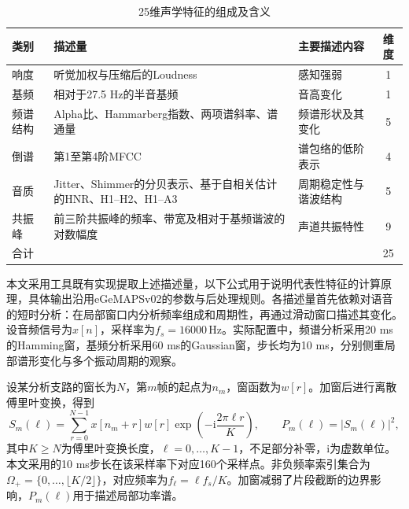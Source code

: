 \begin{table}[H]
    \centering\small
    \caption{25维声学特征的组成及含义}
    \label{tab:p1_acoustic_groups}
    \setlength{\tabcolsep}{6pt}
    \renewcommand{\arraystretch}{1.12}
    \ifdefined\pOneCompactTableBox\else\newsavebox{\pOneCompactTableBox}\fi
    \begin{lrbox}{\pOneCompactTableBox}
    \begin{tabular}{l>{\raggedright\arraybackslash}p{17em}>{\raggedright\arraybackslash}p{10em}c}
        \toprule
        类别 & 描述量 & 主要描述内容 & 维度\\
        \midrule
        响度 & 听觉加权与压缩后的Loudness & 感知强弱 & 1\\
        基频 & 相对于27.5 Hz的半音基频 & 音高变化 & 1\\
        频谱结构 & Alpha比、Hammarberg指数、两项谱斜率、谱通量 & 频谱形状及其变化 & 5\\
        倒谱 & 第1至第4阶MFCC & 谱包络的低阶表示 & 4\\
        音质 & Jitter、Shimmer的分贝表示、基于自相关估计的HNR、H1--H2、H1--A3 & 周期稳定性与谐波结构 & 5\\
        共振峰 & 前三阶共振峰的频率、带宽及相对于基频谐波的对数幅度 & 声道共振特性 & 9\\
        \midrule
        合计 & & & 25\\
        \bottomrule
    \end{tabular}
    \end{lrbox}
    \usebox{\pOneCompactTableBox}
\end{table}

本文采用工具既有实现提取上述描述量，以下公式用于说明代表性特征的计算原理，具体输出沿用eGeMAPSv02的参数与后处理规则。各描述量首先依赖对语音的短时分析：在局部窗口内分析频率组成和周期性，再通过滑动窗口描述其变化。设音频信号为$x[n]$，采样率为$f_s=16000\,\mathrm{Hz}$。实际配置中，频谱分析采用20 ms的Hamming窗，基频分析采用60 ms的Gaussian窗，步长均为10 ms，分别侧重局部谱形变化与多个振动周期的观察。

设某分析支路的窗长为$N$，第$m$帧的起点为$n_m$，窗函数为$w[r]$。加窗后进行离散傅里叶变换，得到
\begin{equation}
    S_m(\ell)=\sum_{r=0}^{N-1}x[n_m+r]w[r]
    \exp\!\left(-\mathrm{i}\frac{2\pi\ell r}{K}\right),
    \qquad P_m(\ell)=|S_m(\ell)|^2,
    \label{eq:p1_audio_spectrum}
\end{equation}
其中$K\geq N$为傅里叶变换长度，$\ell=0,\ldots,K-1$，不足部分补零，$\mathrm{i}$为虚数单位。本文采用的10 ms步长在该采样率下对应160个采样点。非负频率索引集合为$\Omega_+=\{0,\ldots,\lfloor K/2\rfloor\}$，对应频率为$f_\ell=\ell f_s/K$。加窗减弱了片段截断的边界影响，$P_m(\ell)$用于描述局部功率谱。

